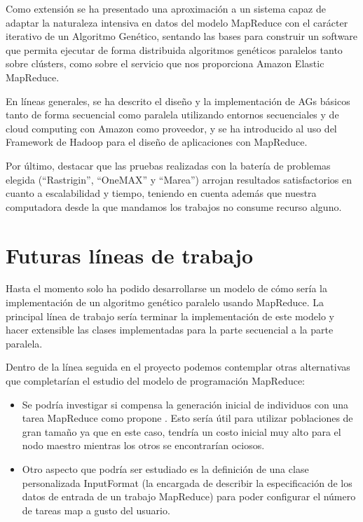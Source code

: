\documentclass[runningheads]{llncs}
\begin{document}
Como extensión se ha presentado una aproximación a un sistema capaz de adaptar la naturaleza intensiva en datos del modelo MapReduce con el carácter 
iterativo de un Algoritmo Genético, sentando las bases para construir un software que permita ejecutar de forma distribuida 
algoritmos genéticos paralelos tanto sobre clústers, como sobre el servicio que nos proporciona Amazon Elastic MapReduce.  


En líneas generales, se ha descrito el diseño y la implementación de AGs básicos tanto de forma secuencial  como paralela utilizando 
entornos secuenciales y de cloud computing con Amazon como proveedor, y se ha introducido al uso del Framework de Hadoop para el 
diseño de aplicaciones con MapReduce.


Por último, destacar que las pruebas realizadas con la batería de problemas elegida (``Rastrigin'', ``OneMAX'' y ``Marea'') arrojan 
resultados satisfactorios en cuanto a escalabilidad y tiempo, teniendo en cuenta además que nuestra computadora desde la que 
mandamos los trabajos no consume recurso alguno. 


\section*{Futuras líneas de trabajo}


Hasta el momento solo ha podido desarrollarse un modelo de cómo sería la implementación de un algoritmo genético paralelo 
usando MapReduce.  La principal línea de trabajo sería terminar la implementación de este modelo y hacer extensible 
las clases implementadas para la parte secuencial a la parte paralela.

Dentro de la línea seguida en el proyecto podemos contemplar otras alternativas que completarían el estudio del modelo de 
programación MapReduce:

\begin{itemize}
 \item Se podría investigar si compensa la generación inicial de individuos con una tarea MapReduce como propone \cite{Gen09}. 
Esto sería útil para utilizar poblaciones de gran tamaño ya que en este caso, tendría un costo inicial muy alto para el 
nodo maestro mientras los otros se encontrarían ociosos.
 \item Otro aspecto que podría ser estudiado es la definición de una clase personalizada InputFormat (la encargada de describir la 
especificación de los datos de entrada de un trabajo MapReduce) para poder configurar el número de tareas map a gusto del usuario.
\end{itemize}
\end{document}
